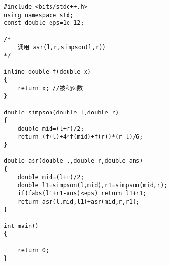 \begin{lstlisting}
#include <bits/stdc++.h>
using namespace std;
const double eps=1e-12;

/*
    调用 asr(l,r,simpson(l,r))
*/

inline double f(double x)
{
    return x; //被积函数
}

double simpson(double l,double r)
{
    double mid=(l+r)/2;
    return (f(l)+4*f(mid)+f(r))*(r-l)/6;
}

double asr(double l,double r,double ans)
{
    double mid=(l+r)/2;
    double l1=simpson(l,mid),r1=simpson(mid,r);
    if(fabs(l1+r1-ans)<eps) return l1+r1;
    return asr(l,mid,l1)+asr(mid,r,r1);
}

int main()
{

    return 0;
}
\end{lstlisting}